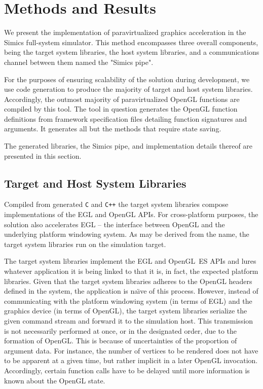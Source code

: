 
\section{Methods and Results}
\label{sec:methodsandresults}
We present the implementation of paravirtualized graphics acceleration in the Simics full-system simulator.
This method encompasses three overall components, being the target system libraries, the host system libraries, and a communications channel between them named the "Simics pipe".

For the purposes of ensuring scalability of the solution during development, we use code generation to produce the majority of target and host system libraries.
Accordingly, the outmost majority of paravirtualized OpenGL functions are compiled by this tool.
The tool in question generates the OpenGL function definitions from framework specification files detailing function signatures and arguments.
It generates all but the methods that require state saving.

The generated libraries, the Simics pipe, and implementation details thereof are presented in this section.

\subsection{Target and Host System Libraries}
\label{sec:proposedsolutionandimplementation_targetandhostsystemlibraries}
Compiled from generated \texttt{C} and \texttt{C++} the target system libraries compose implementations of the EGL and OpenGL APIs.
For cross-platform purposes, the solution also accelerates EGL -- the interface between OpenGL and the underlying platform windowing system.
As may be derived from the name, the target system libraries run on the simulation target.

The target system libraries implement the EGL and OpenGL~ES APIs and lures whatever application it is being linked to that it is, in fact, the expected platform libraries.
Given that the target system libraries adheres to the OpenGL headers defined in the system, the application is na\"{\i}ve of this process.
However, instead of communicating with the platform windowing system (in terms of EGL) and the graphics device (in terms of OpenGL), the target system libraries serialize the given command stream and forward it to the simulation host.
This transmission is not necessarily performed at once, or in the designated order, due to the formation of OpenGL.
This is because of uncertainties of the proportion of argument data.
For instance, the number of vertices to be rendered does not have to be apparent at a given time, but rather implicit in a later OpenGL invocation.
Accordingly, certain function calls have to be delayed until more information is known about the OpenGL state.

